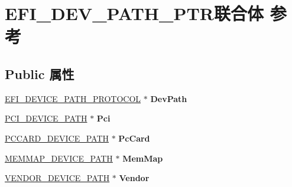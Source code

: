 \hypertarget{union_e_f_i___d_e_v___p_a_t_h___p_t_r}{}\section{E\+F\+I\+\_\+\+D\+E\+V\+\_\+\+P\+A\+T\+H\+\_\+\+P\+T\+R联合体 参考}
\label{union_e_f_i___d_e_v___p_a_t_h___p_t_r}
\subsection*{Public 属性}
\begin{DoxyCompactItemize}
\item 
\mbox{\label{union_e_f_i___d_e_v___p_a_t_h___p_t_r_a113ef2474cd0de690883e24de210c188}} 
\hyperlink{struct_e_f_i___d_e_v_i_c_e___p_a_t_h___p_r_o_t_o_c_o_l}{E\+F\+I\+\_\+\+D\+E\+V\+I\+C\+E\+\_\+\+P\+A\+T\+H\+\_\+\+P\+R\+O\+T\+O\+C\+OL} $\ast$ {\bfseries Dev\+Path}
\item 
\mbox{\label{union_e_f_i___d_e_v___p_a_t_h___p_t_r_a4ab8c56882489b8bbd83ec647d4b2973}} 
\hyperlink{struct_p_c_i___d_e_v_i_c_e___p_a_t_h}{P\+C\+I\+\_\+\+D\+E\+V\+I\+C\+E\+\_\+\+P\+A\+TH} $\ast$ {\bfseries Pci}
\item 
\mbox{\label{union_e_f_i___d_e_v___p_a_t_h___p_t_r_a4ede691d9e508d830993949f002052ab}} 
\hyperlink{struct_p_c_c_a_r_d___d_e_v_i_c_e___p_a_t_h}{P\+C\+C\+A\+R\+D\+\_\+\+D\+E\+V\+I\+C\+E\+\_\+\+P\+A\+TH} $\ast$ {\bfseries Pc\+Card}
\item 
\mbox{\label{union_e_f_i___d_e_v___p_a_t_h___p_t_r_adb57dffbf730c4d6894e97cf4c26fa24}} 
\hyperlink{struct_m_e_m_m_a_p___d_e_v_i_c_e___p_a_t_h}{M\+E\+M\+M\+A\+P\+\_\+\+D\+E\+V\+I\+C\+E\+\_\+\+P\+A\+TH} $\ast$ {\bfseries Mem\+Map}
\item 
\mbox{\label{union_e_f_i___d_e_v___p_a_t_h___p_t_r_a4e17089db99a4b087cd5e5ae55783411}} 
\hyperlink{struct_v_e_n_d_o_r___d_e_v_i_c_e___p_a_t_h}{V\+E\+N\+D\+O\+R\+\_\+\+D\+E\+V\+I\+C\+E\+\_\+\+P\+A\+TH} $\ast$ {\bfseries Vendor}
\item 
\mbox{\label{union_e_f_i___d_e_v___p_a_t_h___p_t_r_a03326e8ec24e9d1a200009ae20a49b44}} 

\end{DoxyCompactItemize}
